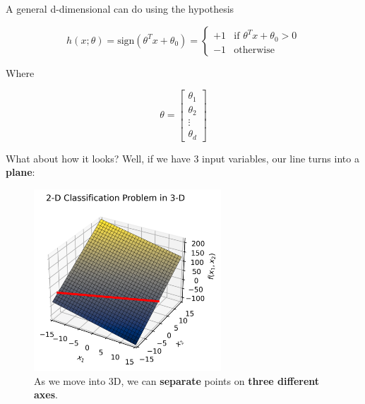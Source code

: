         \begin{kequation}
            A general d-dimensional  can do  using the hypothesis
            
            \begin{equation*}
                h(x; \theta) = \text{sign}(\theta^T x + \theta_0 )= 
                \begin{cases}
                    +1 & \text{if $\theta^T x + \theta_0 > 0$} \\
                    -1 & \text{otherwise}
                \end{cases}
            \end{equation*}
            
            Where
            
            \begin{equation*}
                \theta = 
                \begin{bmatrix}
                  \theta_1 \\ \theta_2 \\ \vdots \\ \theta_d
                \end{bmatrix}
            \end{equation*}
        \end{kequation}
        
        What about how it looks? Well, if we have 3 input variables, our line turns into a \textbf{plane}:
        
        \begin{figure}[H]
            \centering
            
            \includegraphics[width=70mm,scale=0.5]{images/classification_images/3d_classification_problem.png}

            \caption*{As we move into 3D, we can \textbf{separate} points on \textbf{three different axes}.}
        \end{figure}
        
